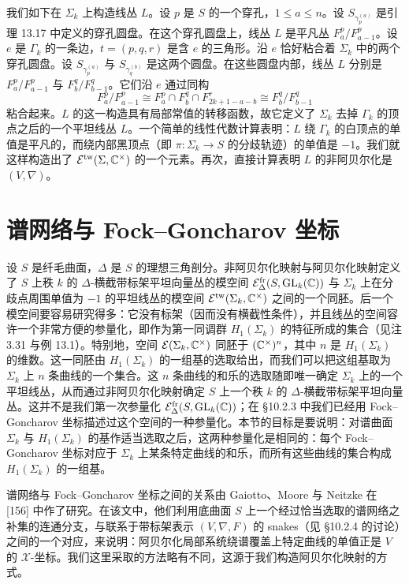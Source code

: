 我们如下在 $\Sigma_k$ 上构造线丛 $L$。设 $p$ 是 $S$ 的一个穿孔，$1\le a\le n$。设 $S_{\gamma_p^{(a)}}$ 是引理 13.17 中定义的穿孔圆盘。在这个穿孔圆盘上，线丛 $L$ 是平凡丛 $F^p_a/F^p_{a-1}$。设 $e$ 是 $\Gamma_k$ 的一条边，$t=(p,q,r)$ 是含 $e$ 的三角形。沿 $e$ 恰好粘合着 $\Sigma_k$ 中的两个穿孔圆盘。设 $S_{\gamma_p^{(a)}}$ 与 $S_{\gamma_q^{(b)}}$ 是这两个圆盘。在这些圆盘内部，线丛 $L$ 分别是 $F^p_a/F^p_{a-1}$ 与 $F^q_b/F^q_{b-1}$。它们沿 $e$ 通过同构
\[
F^p_a/F^p_{a-1}\cong F^p_a\cap F^q_b\cap F^r_{2k+1-a-b}\cong F^q_b/F^q_{b-1}
\]
粘合起来。$L$ 的这一构造具有局部常值的转移函数，故它定义了 $\Sigma_k$ 去掉 $\Gamma_k$ 的顶点之后的一个平坦线丛 $L$。一个简单的线性代数计算表明：$L$ 绕 $\Gamma_k$ 的白顶点的单值是平凡的，而绕内部黑顶点（即 $\pi\colon\Sigma_k\to S$ 的分歧轨迹）的单值是 $-1$。我们就这样构造出了 $\mathcal{E}^{\mathrm{tw}}(\Sigma,\mathbb{C}^\times)$ 的一个元素。再次，直接计算表明 $L$ 的非阿贝尔化是 $(V,\nabla)$。

\section{谱网络与 Fock–Goncharov 坐标}

设 $S$ 是纤毛曲面，$\Delta$ 是 $S$ 的理想三角剖分。非阿贝尔化映射与阿贝尔化映射定义了 $S$ 上秩 $k$ 的 $\Delta$-横截带标架平坦向量丛的模空间 $\mathcal{E}^{\mathrm{fr}}_\Delta(S,\operatorname{GL}_k(\mathbb{C}))$ 与 $\Sigma_k$ 上在分歧点周围单值为 $-1$ 的平坦线丛的模空间 $\mathcal{E}^{\mathrm{tw}}(\Sigma_k,\mathbb{C}^\times)$ 之间的一个同胚。后一个模空间要容易研究得多：它没有标架（因而没有横截性条件），并且线丛的空间容许一个非常方便的参量化，即作为第一同调群 $H_1(\Sigma_k)$ 的特征所成的集合（见注 3.31 与例 13.1）。特别地，空间 $\mathcal{E}(\Sigma_k,\mathbb{C}^\times)$ 同胚于 $(\mathbb{C}^\times)^n$，其中 $n$ 是 $H_1(\Sigma_k)$ 的维数。这一同胚由 $H_1(\Sigma_k)$ 的一组基的选取给出，而我们可以把这组基取为 $\Sigma_k$ 上 $n$ 条曲线的一个集合。这 $n$ 条曲线的和乐的选取随即唯一确定 $\Sigma_k$ 上的一个平坦线丛，从而通过非阿贝尔化映射确定 $S$ 上一个秩 $k$ 的 $\Delta$-横截带标架平坦向量丛。这并不是我们第一次参量化 $\mathcal{E}^{\mathrm{fr}}_\Delta(S,\operatorname{GL}_k(\mathbb{C}))$；在 §10.2.3 中我们已经用 Fock–Goncharov 坐标描述过这个空间的一种参量化。本节的目标是要说明：对谱曲面 $\Sigma_k$ 与 $H_1(\Sigma_k)$ 的基作适当选取之后，这两种参量化是相同的：每个 Fock–Goncharov 坐标对应于 $\Sigma_k$ 上某条特定曲线的和乐，而所有这些曲线的集合构成 $H_1(\Sigma_k)$ 的一组基。

谱网络与 Fock–Goncharov 坐标之间的关系由 Gaiotto、Moore 与 Neitzke 在 [156] 中作了研究。在该文中，他们利用底曲面 $S$ 上一个经过恰当选取的谱网络之补集的连通分支，与联系于带标架表示 $(V,\nabla,F)$ 的 snakes（见 §10.2.4 的讨论）之间的一个对应，来说明：阿贝尔化局部系统绕谱覆盖上特定曲线的单值正是 $V$ 的 $\mathcal{X}$-坐标。我们这里采取的方法略有不同，这源于我们构造阿贝尔化映射的方式。


